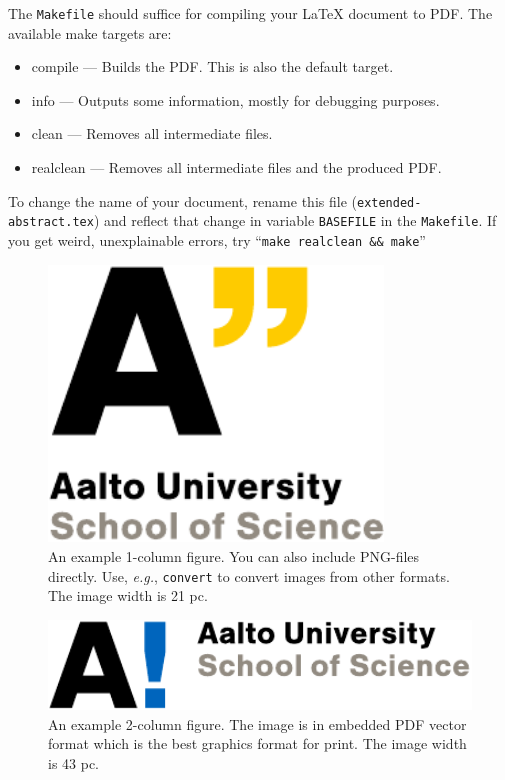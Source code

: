 \documentclass[conference,a4paper]{IEEEtran}
\begin{document}
The \texttt{Makefile} should suffice for compiling your \LaTeX{}
document to PDF. The available make targets are:
\begin{itemize}
\item compile --- Builds the PDF. This is also the default target.
\item info --- Outputs some information, mostly for debugging purposes.
\item clean --- Removes all intermediate files.
\item realclean --- Removes all intermediate files and the produced
  PDF.
\end{itemize}
To change the name of your document, rename this file
(\texttt{extended-abstract.tex}) and reflect that change in variable
\texttt{BASEFILE} in the \texttt{Makefile}. If you get weird,
unexplainable errors, try ``\texttt{make realclean \&\& make}''


\begin{figure}[!t]
\centering
\includegraphics[width=21pc]{Aalto_EN_SCI_21_RGB_y2.pdf}
\caption{An example 1-column figure. You can also include PNG-files
  directly. Use, \emph{e.g.}, \texttt{convert} to convert images from
  other formats. The image width is 21 pc.}
\label{fig:example-1col}
\end{figure}

\begin{figure}[t]
\centering
\includegraphics[width=43pc]{Aalto_EN_SCI_13_RGB_b1.pdf}
\caption{An example 2-column figure. The image is in embedded PDF
  vector format which is the best graphics format for print. The image
  width is 43 pc.}
\label{fig:example-2col}
\end{figure}



\end{document}

